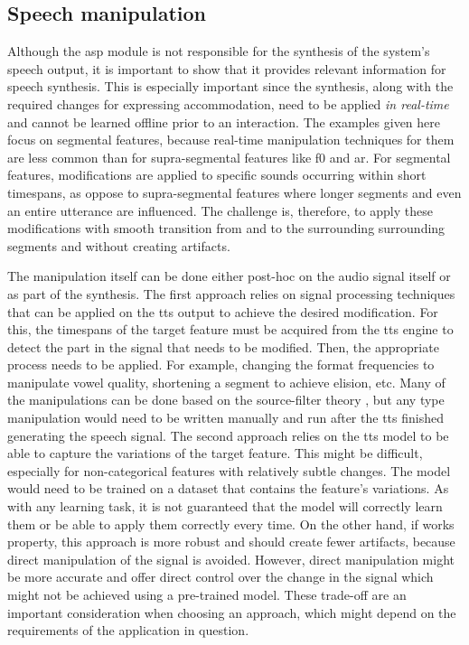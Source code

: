 \subsection{Speech manipulation}
\label{subsec:speech_manipulation}

Although the \ac{asp} module is not responsible for the synthesis of the system's speech output, it is important to show that it provides relevant information for speech synthesis.
This is especially important since the synthesis, along with the required changes for expressing accommodation, need to be applied \emph{in real-time} and cannot be learned offline prior to an interaction.
The examples given here focus on segmental features, because real-time manipulation techniques for them are less common than for supra-segmental features like \ac{f0} and \ac{ar}.
For segmental features, modifications are applied to specific sounds occurring within short timespans, as oppose to supra-segmental features where longer segments and even an entire utterance are influenced.
The challenge is, therefore, to apply these modifications with smooth transition from and to the surrounding surrounding segments and without creating artifacts.

The manipulation itself can be done either post-hoc on the audio signal itself or as part of the synthesis.
The first approach relies on signal processing techniques that can be applied on the \ac{tts} output to achieve the desired modification.
For this, the timespans of the target feature must be acquired from the \ac{tts} engine to detect the part in the signal that needs to be modified.
Then, the appropriate process needs to be applied.
For example, changing the format frequencies to manipulate vowel quality, shortening a segment to achieve \textipa{[@]} elision, etc.
Many of the manipulations can be done based on the source-filter theory \citep{Fant1970acoustic}, but any type manipulation would need to be written manually and run after the \ac{tts} finished generating the speech signal.
The second approach relies on the \ac{tts} model to be able to capture the variations of the target feature.
This might be difficult, especially for non-categorical features with relatively subtle changes.
The model would need to be trained on a dataset that contains the feature's variations.
As with any learning task, it is not guaranteed that the model will correctly learn them or be able to apply them correctly every time.
On the other hand, if works property, this approach is more robust and should create fewer artifacts, because direct manipulation of the signal is avoided.
However, direct manipulation might be more accurate and offer direct control over the change in the signal which might not be achieved using a pre-trained model.
These trade-off are an important consideration when choosing an approach, which might depend on the requirements of the application in question.


